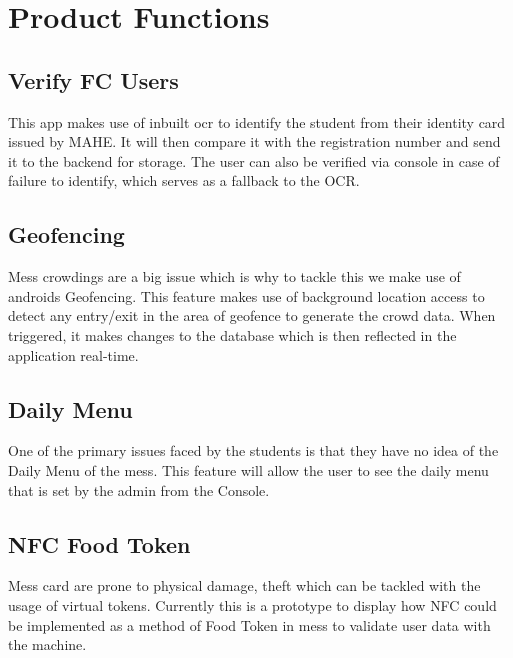 \documentclass[12pt]{article}
\begin{document}
\section*{\LARGE{Product Functions}}

\subsection*{Verify FC Users}
{\justify This app makes use of inbuilt \gls{ocr} to identify the student from their identity card issued by MAHE. It will then compare it with the registration number and send it to the backend for storage. The user can also be verified via console in case of failure to identify, which serves as a fallback to the OCR.}

\subsection*{Geofencing}
{\justify Mess crowdings are a big issue which is why to tackle this we make use of android\textquotesingle s Geofencing. This feature makes use of background location access to detect any entry/exit in the area of \gls{geofence} to generate the crowd data. When triggered, it makes changes to the database which is then reflected in the application real-time.}

\subsection*{Daily Menu}
{\justify One of the primary issues faced by the students is that they have no idea of the Daily Menu of the mess. This feature will allow the user to see the daily menu that is set by the admin from the Console.}

\subsection*{NFC Food Token}
{\justify Mess card are prone to physical damage, theft which can be tackled with the usage of virtual tokens. Currently this is a prototype to display how \gls{NFC} could be implemented as a method of Food Token in mess to validate user data with the machine.}
\end{document}
